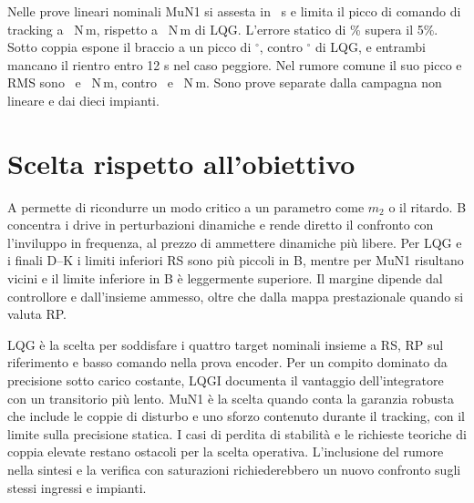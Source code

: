 Nelle prove lineari nominali MuN1 si assesta in
\FinMuNOneTs\ s e limita il picco di comando di
tracking a \FinMuNOnePiccoComando\ N\,m, rispetto
a \FinLQGTrackPeak\ N\,m di LQG. L'errore statico
di \FinMuNOneDC\% supera il 5\%. Sotto coppia espone
il braccio a un picco di \FinMuNOneDisturbo$^\circ$,
contro \FinLQGDisturboStudio$^\circ$ di LQG, e
entrambi mancano il rientro entro 12 s nel caso peggiore.
Nel rumore comune il suo picco e RMS sono
\FinMuNOneRumore\ e \FinMuNOneRMSRumore\ N\,m,
contro \FinLQGPeak\ e \FinLQGRms\ N\,m. Sono prove
separate dalla campagna non lineare e dai dieci impianti.

\section{Scelta rispetto all'obiettivo}
A permette di ricondurre un modo critico a un parametro
come $m_2$ o il ritardo. B concentra i drive in
perturbazioni dinamiche e rende diretto il confronto
con l'inviluppo in frequenza, al prezzo di ammettere
dinamiche più libere. Per LQG e i finali D--K i limiti
inferiori RS sono più piccoli in B, mentre per MuN1
risultano vicini e il limite inferiore in B è leggermente
superiore. Il margine dipende dal controllore e
dall'insieme ammesso, oltre che dalla mappa prestazionale
quando si valuta RP.

LQG è la scelta per soddisfare i quattro target nominali
insieme a RS, RP sul riferimento e basso comando
nella prova encoder. Per un compito dominato da
precisione sotto carico costante, LQGI documenta il
vantaggio dell'integratore con un transitorio più lento.
MuN1 è la scelta quando conta la garanzia robusta che include
le coppie di disturbo e uno sforzo contenuto durante il tracking,
con il limite sulla precisione statica.
I casi di perdita di stabilità e le richieste teoriche
di coppia elevate restano ostacoli per la scelta
operativa. L'inclusione del rumore nella sintesi e la
verifica con saturazioni richiederebbero un nuovo
confronto sugli stessi ingressi e impianti.
\FloatBarrier
